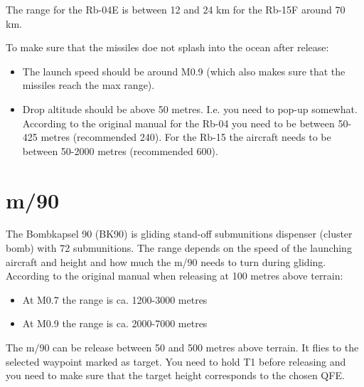 The range for the Rb-04E is between 12 and 24 km \textasciimacron for the Rb-15F around 70 km.

To make sure that the missiles doe not splash into the ocean after release:
\begin{itemize}
  \item The launch speed should be around M0.9 (which also makes sure that the missiles reach the max range).
  \item Drop altitude should be above 50 metres. I.e. you need to pop-up somewhat. According to the original manual for the Rb-04 you need to be between 50-425 metres (recommended 240). For the Rb-15 the aircraft needs to be between 50-2000 metres (recommended 600).
\end{itemize}

\section{m/90}
The Bombkapsel 90 (BK90) is gliding stand-off submunitions dispenser (cluster bomb) with 72 submunitions. The range depends on the speed of the launching aircraft and height and how much the m/90 needs to turn during gliding. According to the original manual when releasing at 100 metres above terrain:
\begin{itemize}
  \item At M0.7 the range is ca. 1200-3000 metres
  \item At M0.9 the range is ca. 2000-7000 metres
\end{itemize}

The m/90 can be release between 50 and 500 metres above terrain. It flies to the selected waypoint marked as target. You need to hold T1 before releasing and you need to make sure that the target height corresponds to the chosen QFE.
